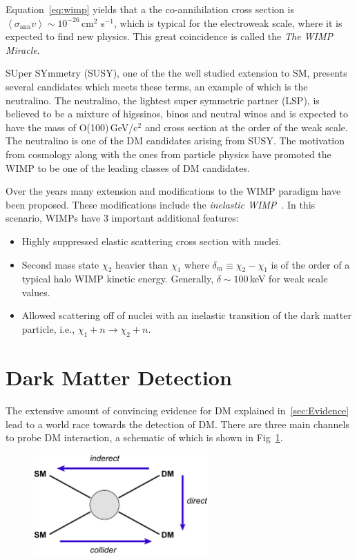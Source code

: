 Equation~\ref{eq:wimp} yields that a the co-annihilation cross section is $\left<\sigma_{\mathrm{ann}}v\right> \sim 10^{-26}$\,cm$^2$ s$^{-1}$, which is typical for the electroweak scale, where it is expected to find new physics. This great coincidence is called the \textit{The WIMP Miracle}.

SUper SYmmetry (SUSY), one of the the well studied extension to SM, presents several candidates which meets these terms, an example of which is the neutralino. The neutralino, the lightest super symmetric partner (LSP), is believed to be a mixture of higssinos, binos and neutral winos and is expected to have the mass of O(100)\,GeV/c$^2$ and cross section at the order of the weak scale. The neutralino is one of the DM candidates arising from SUSY. The motivation from cosmology along with the ones from particle physics have promoted the WIMP to be one of the leading classes of DM candidates. 

Over the years many extension and modifications to the WIMP paradigm have been proposed. These modifications include the \textit{inelastic WIMP}~\cite{InelasticIntro}. In this scenario, WIMPs have 3 important additional features:
\begin{itemize}
\item Highly suppressed elastic scattering cross section with nuclei.
\item Second mass state $\chi_2$ heavier than $\chi_1$ where $\delta_m \equiv \chi_2 - \chi_1$ is of the order of a typical halo WIMP kinetic energy. Generally, $\delta \sim 100$\,keV for weak scale values. 
\item Allowed scattering off of nuclei with an inelastic transition of the dark matter particle, i.e., $\chi_1 + n \rightarrow \chi_2 + n$.
\end{itemize}




\section{Dark Matter Detection}
\label{sec:DMDet}

The extensive amount of convincing evidence for DM explained in~\ref{sec:Evidence} lead to a world race towards the detection of DM. There are three main channels to probe DM interaction, a schematic of which is shown in Fig~\ref{fig:detectionScheme}.

\begin{figure}[]
	\centering
	\includegraphics[width=0.6\textwidth]{figs/detection_channels.png}
	\label{fig:detectionScheme}
\end{figure}  

